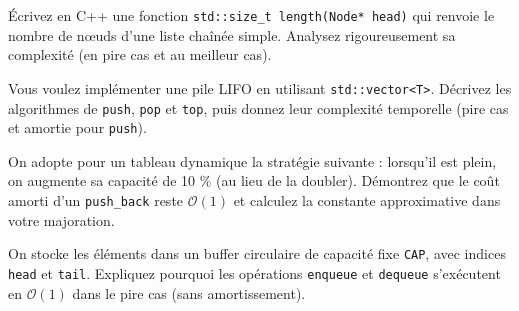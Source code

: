 \begin{exercice}
Écrivez en C++ une fonction
\lstinline|std::size_t length(Node* head)| qui renvoie le nombre de nœuds
d’une liste chaînée simple. Analysez rigoureusement sa complexité
(en pire cas et au meilleur cas).
\end{exercice}

\begin{exercice}
Vous voulez implémenter une pile LIFO en utilisant \lstinline|std::vector<T>|.
Décrivez les algorithmes de \lstinline|push|, \lstinline|pop| et
\lstinline|top|, puis donnez leur complexité temporelle (pire cas et amortie
pour \lstinline|push|).
\end{exercice}

\begin{exercice}
On adopte pour un tableau dynamique la stratégie suivante : lorsqu’il est plein,
on augmente sa capacité de 10 \% (au lieu de la doubler).
Démontrez que le coût amorti d’un \lstinline|push_back| reste \(\mathcal{O}(1)\)
et calculez la constante approximative dans votre majoration.
\end{exercice}

\begin{exercice}
On stocke les éléments dans un buffer circulaire de capacité fixe
\lstinline|CAP|, avec indices \lstinline|head| et \lstinline|tail|.
Expliquez pourquoi les opérations \lstinline|enqueue| et \lstinline|dequeue|
s’exécutent en \(\mathcal{O}(1)\) dans le pire cas (sans amortissement).
\end{exercice}


